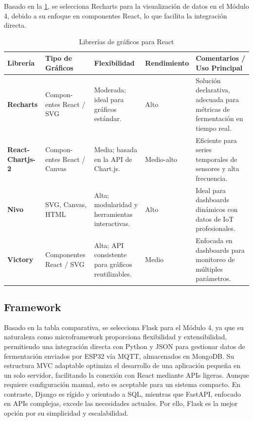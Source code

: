 Basado en la \cref{tab:graficas}, se selecciona Recharts para la visualización de datos en el Módulo 4,
debido a su enfoque en componentes React, lo que facilita la integración directa.

\begin{table}[H] %
    \caption{Librerías de gráficos para React}
    \label{tab:graficas}
    \begingroup
    \setlength{\tabcolsep}{4pt} 
    \renewcommand{\arraystretch}{1.5} 
    \footnotesize 
    \begin{tabularx}{\textwidth}{|>{\RaggedRight}p{1.9cm}|>{\RaggedRight}p{1.7cm}|>{\RaggedRight}X|>{\RaggedRight}p{2.2cm}|>{\RaggedRight}X|}
    \hline
    \textbf{Librería} & \textbf{Tipo de Gráficos} & \textbf{Flexibilidad} & \textbf{Rendimiento} & \textbf{Comentarios / Uso Principal} \\
    \hline
    \textbf{Recharts} \cite{zotero-item-220} & Compon- entes React / SVG & Moderada; ideal para gráficos estándar. & Alto & Solución declarativa, adecuada para métricas de fermentación en tiempo real. \\
    \hline
    \textbf{React-Chartjs-2} \cite{zotero-item-222} & Compon- entes React / Canvas & Media; basada en la API de Chart.js. & Medio-alto & Eficiente para series temporales de sensores y alta frecuencia. \\
    \hline
    \textbf{Nivo} \cite{zotero-item-224} & SVG, Canvas, HTML & Alta; modularidad y herramientas interactivas. & Alto & Ideal para dashboards dinámicos con datos de IoT profesionales. \\
    \hline
    \textbf{Victory} \cite{zotero-item-226} & Componentes React / SVG & Alta; API consistente para gráficos reutilizables. & Medio & Enfocada en dashboards para monitoreo de múltiples parámetros. \\
    \hline
    \end{tabularx}
    \endgroup
\end{table}

\subsection{Framework}

Basado en la tabla comparativa, se selecciona Flask para el Módulo 4, 
ya que su naturaleza como microframework proporciona flexibilidad y extensibilidad,
permitiendo una integración directa con Python y JSON para gestionar datos de fermentación
enviados por ESP32 vía MQTT, almacenados en MongoDB. Su estructura MVC adaptable optimiza 
el desarrollo de una aplicación pequeña en un solo servidor, facilitando la conexión con React 
mediante APIs ligeras. Aunque requiere configuración manual, esto es aceptable para un sistema compacto. 
En contraste, Django es rígido y orientado a SQL, mientras que FastAPI, enfocado en APIs complejas, excede 
las necesidades actuales. Por ello, Flask es la mejor opción por su simplicidad y escalabilidad.

